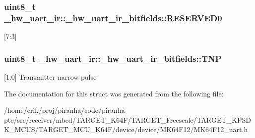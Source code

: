 \subsubsection[{\texorpdfstring{R\+E\+S\+E\+R\+V\+E\+D0}{RESERVED0}}]{\setlength{\rightskip}{0pt plus 5cm}uint8\+\_\+t \+\_\+hw\+\_\+uart\+\_\+ir\+::\+\_\+hw\+\_\+uart\+\_\+ir\+\_\+bitfields\+::\+R\+E\+S\+E\+R\+V\+E\+D0}\hypertarget{struct__hw__uart__ir_1_1__hw__uart__ir__bitfields_a8720c95af12b8f9bd121109a616e4531}{}\label{struct__hw__uart__ir_1_1__hw__uart__ir__bitfields_a8720c95af12b8f9bd121109a616e4531}
\mbox{[}7\+:3\mbox{]} 
\subsubsection[{\texorpdfstring{T\+NP}{TNP}}]{\setlength{\rightskip}{0pt plus 5cm}uint8\+\_\+t \+\_\+hw\+\_\+uart\+\_\+ir\+::\+\_\+hw\+\_\+uart\+\_\+ir\+\_\+bitfields\+::\+T\+NP}\hypertarget{struct__hw__uart__ir_1_1__hw__uart__ir__bitfields_a047b75c7a5dc5ccbeb661bd3aac4495f}{}\label{struct__hw__uart__ir_1_1__hw__uart__ir__bitfields_a047b75c7a5dc5ccbeb661bd3aac4495f}
\mbox{[}1\+:0\mbox{]} Transmitter narrow pulse 

The documentation for this struct was generated from the following file\+:\begin{DoxyCompactItemize}
\item 
/home/erik/proj/piranha/code/piranha-\/ptc/src/receiver/mbed/\+T\+A\+R\+G\+E\+T\+\_\+\+K64\+F/\+T\+A\+R\+G\+E\+T\+\_\+\+Freescale/\+T\+A\+R\+G\+E\+T\+\_\+\+K\+P\+S\+D\+K\+\_\+\+M\+C\+U\+S/\+T\+A\+R\+G\+E\+T\+\_\+\+M\+C\+U\+\_\+\+K64\+F/device/device/\+M\+K64\+F12/M\+K64\+F12\+\_\+uart.\+h\end{DoxyCompactItemize}
